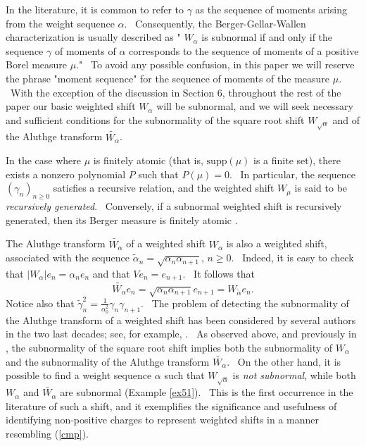 \documentclass[12pt]{amsart}
\begin{document}
In the literature, it is common to refer to $\gamma$ as the sequence of moments arising from the weight sequence $\alpha$. \ Consequently, the Berger-Gellar-Wallen characterization is usually described as "  $W_\alpha$ is subnormal if and only if the sequence $\gamma$ of moments of $\alpha$ corresponds to the sequence of moments of a positive Borel measure $\mu$." \ To avoid any possible confusion, in this paper we will reserve the phrase "moment sequence" for the sequence of moments of the measure $\mu$. \ With the exception of the discussion in Section 6, throughout the rest of the paper our basic weighted shift $W_\alpha$ will be subnormal, and we will seek necessary and sufficient conditions for the subnormality of the square root shift $W_{\sqrt{\alpha}}$ and of the Aluthge transform $\widetilde{W_\alpha}$. \ 

In the case where $\mu$ is finitely atomic (that is, $\textrm{supp}(\mu)$ is a finite set), there exists a nonzero polynomial $P$ such that $P(\mu)=0$. \ In particular, the sequence $(\gamma_n)_{n\geq0}$ satisfies a recursive relation, and the weighted shift $W_\mu$ is said to be {\it recursively generated}. \ Conversely, if a subnormal weighted shift is recursively generated, then its Berger measure is finitely atomic \cite[Remark 3.10(i)]{CF}.


The Aluthge transform $\widetilde{ W_\alpha}$ of a weighted shift  $W_\alpha$  is also a weighted shift, associated with the sequence ${\tilde  \alpha}_n=\sqrt{\alpha_n\alpha_{n+1}}, \, n\ge 0$. \ Indeed, it is easy to check that  $|W_\alpha| e_n=\alpha_ne_n$ and that $Ve_n=e_{n+1}$. \ It   follows that
$$\widetilde{ W_\alpha} e_n= \sqrt{\alpha_n\alpha_{n+1}}e_{n+1}= W_{\tilde \alpha}e_n.$$
Notice also that ${\tilde \gamma}^2_n= \frac{1}{\alpha_0^2}\gamma_n \gamma_{n+1}$. \ The problem of detecting the subnormality of the Aluthge transform of a weighted shift has been considered by several authors in the two last decades; see, for example, \cite{exn}. \ As observed above, and previously in \cite{curt1}, the subnormality of the square root shift implies both the subnormality of $W_\alpha$ and the subnormality of the Aluthge transform $\widetilde{ W_\alpha}$. \ On the other hand, it is possible to find a weight sequence $\alpha$ such that $W_{\sqrt{\alpha}}$ is {\it not subnormal}, while both $W_\alpha$ and $\widetilde{ W_\alpha}$ are subnormal (Example \ref{ex51}). \ This is the first occurrence in the literature of such a shift, and it exemplifies the significance and usefulness of identifying non-positive charges to represent weighted shifts in a manner resembling (\ref{cmp}). 
\end{document}
